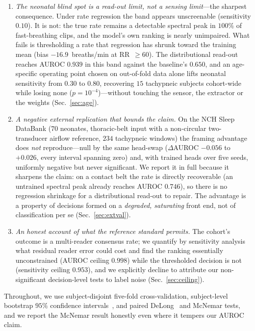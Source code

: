\documentclass[journal]{IEEEtran}
\begin{document}
\begin{enumerate}
\item \emph{The neonatal blind spot is a read-out limit, not a sensing limit}---the sharpest
consequence. Under rate regression the band appears unscreenable (sensitivity $0.10$). It is not: the
true rate remains a detectable spectral peak in $100\%$ of fast-breathing clips, and the model's own
ranking is nearly unimpaired. What fails is thresholding a rate that regression has shrunk toward the
training mean (bias $-16.9$~breaths/min at RR~$\ge\!60$). The distributional read-out reaches AUROC
$0.939$ in this band against the baseline's $0.650$, and an age-specific operating point chosen on
out-of-fold data alone lifts neonatal sensitivity from $0.30$ to $0.80$, recovering $15$ tachypneic
subjects cohort-wide while losing none ($p=10^{-4}$)---without touching the sensor, the extractor or
the weights (Sec.~\ref{sec:age}).

\item \emph{A negative external replication that bounds the claim.} On the NCH Sleep DataBank
($70$ neonates, thoracic-belt input with a non-circular two-transducer airflow reference, $234$
tachypneic windows) the framing advantage does \emph{not} reproduce---null by the same head-swap
($\Delta$AUROC ${-}0.056$ to ${+}0.026$, every interval spanning zero) and, with trained heads over
five seeds, uniformly negative but never significant. We report it in full because it sharpens the
claim: on a contact belt the rate is directly recoverable (an untrained spectral peak already reaches
AUROC $0.746$), so there is no regression shrinkage for a distributional read-out to repair. The
advantage is a property of decisions formed on a \emph{degraded, saturating} front end, not of
classification per se (Sec.~\ref{sec:extval}).

\item \emph{An honest account of what the reference standard permits.} The cohort's outcome is a
multi-reader consensus rate; we quantify by sensitivity analysis what residual reader error could cost
and find the ranking essentially unconstrained (AUROC ceiling $0.998$) while the thresholded decision
is not (sensitivity ceiling $0.953$), and we explicitly decline to attribute our non-significant
decision-level tests to label noise (Sec.~\ref{sec:ceiling}).

\end{enumerate}
Throughout, we use subject-disjoint five-fold cross-validation, subject-level bootstrap $95\%$ confidence
intervals~\cite{efron_bootstrap}, and paired DeLong~\cite{delong} and McNemar tests, and we report the
McNemar result honestly even where it tempers our AUROC claim.
\end{document}

